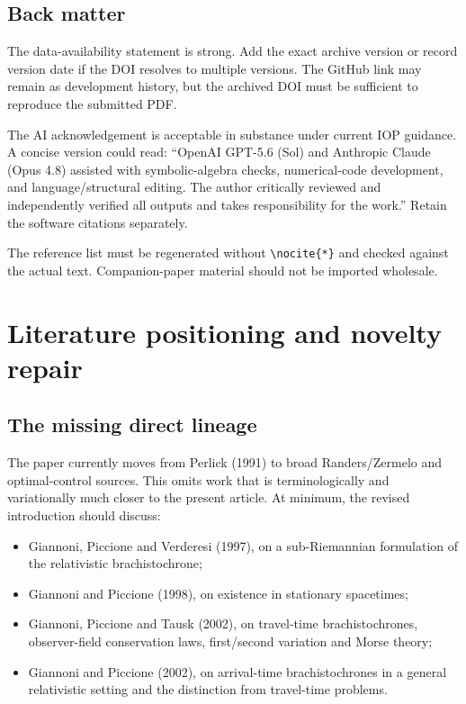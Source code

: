 \documentclass[11pt,a4paper]{article}
\begin{document}
\subsection{Back matter}

The data-availability statement is strong.  Add the exact archive version or record version date
if the DOI resolves to multiple versions.  The GitHub link may remain as development history, but
the archived DOI must be sufficient to reproduce the submitted PDF.

The AI acknowledgement is acceptable in substance under current IOP guidance.  A concise version
could read: ``OpenAI GPT-5.6 (Sol) and Anthropic Claude (Opus 4.8) assisted with symbolic-algebra
checks, numerical-code development, and language/structural editing.  The author critically
reviewed and independently verified all outputs and takes responsibility for the work.''  Retain
the software citations separately.

The reference list must be regenerated without \verb|\nocite{*}| and checked against the actual
text.  Companion-paper material should not be imported wholesale.

\section{Literature positioning and novelty repair}

\subsection{The missing direct lineage}

The paper currently moves from Perlick (1991) to broad Randers/Zermelo and optimal-control sources.
This omits work that is terminologically and variationally much closer to the present article.
At minimum, the revised introduction should discuss:

\begin{itemize}
  \item Giannoni, Piccione and Verderesi (1997), on a sub-Riemannian formulation of the relativistic
  brachistochrone;
  \item Giannoni and Piccione (1998), on existence in stationary spacetimes;
  \item Giannoni, Piccione and Tausk (2002), on travel-time brachistochrones, observer-field
  conservation laws, first/second variation and Morse theory;
  \item Giannoni and Piccione (2002), on arrival-time brachistochrones in a general relativistic
  setting and the distinction from travel-time problems.
\end{itemize}
\end{document}
